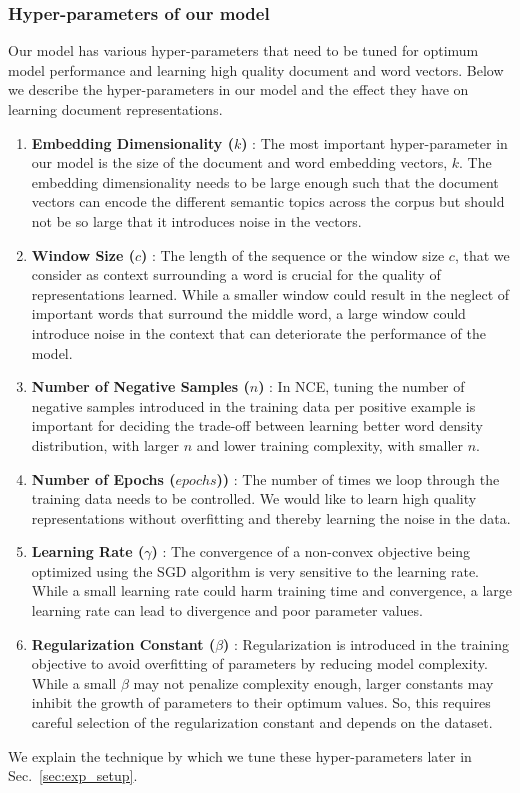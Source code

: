 \subsubsection{Hyper-parameters of our model}
\label{sec:hp_doc}
Our model has various hyper-parameters that need to be tuned for optimum model performance and learning high quality document and word vectors. Below we describe the hyper-parameters in our model and the effect they have on learning document representations.
\begin{enumerate}
\item \textbf{Embedding Dimensionality ($k$)} : The most important hyper-parameter in our model is the size of the document and word embedding vectors, $k$. The embedding dimensionality needs to be large enough such that the document vectors can encode the different semantic topics across the corpus but should not be so large that it introduces noise in the vectors.

\item \textbf{Window  Size ($c$)} : The length of the sequence or the window size $c$, that we consider as context surrounding a word is crucial for the quality of representations learned. While a smaller window could result in the neglect of important words that surround the middle word, a large window could introduce noise in the context that can deteriorate the performance of the model.

\item \textbf{Number of Negative Samples ($n$)} : In NCE, tuning the number of negative samples introduced in the training data per positive example is important for deciding the trade-off between learning better word density distribution, with larger $n$ and lower training complexity, with smaller $n$. 

\item \textbf{Number of Epochs ($epochs$))} : The number of times we loop through the training data needs to be controlled. We would like to learn high quality representations without overfitting and thereby learning the noise in the data.

\item \textbf{Learning Rate ($\gamma$)} : The convergence of a non-convex objective being optimized using the SGD algorithm is very sensitive to
the learning rate. While a small learning rate could harm training time and convergence, a large learning rate can lead to divergence and poor parameter values.

\item \textbf{Regularization Constant ($\beta$)} : Regularization is introduced in the training objective to avoid overfitting of parameters by reducing model complexity. While a small $\beta$ may not penalize complexity enough, larger constants may inhibit the growth of parameters to their optimum values. So, this requires careful selection of the regularization constant and depends on the dataset.
\end{enumerate}
We explain the technique by which we tune these hyper-parameters later in Sec.~\ref{sec:exp_setup}.




